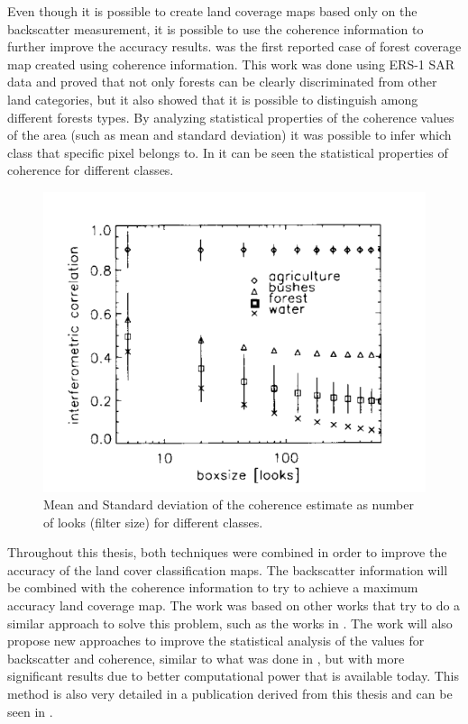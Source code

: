 Even though it is possible to create land coverage maps based only on the backscatter measurement, it is possible to use the coherence information to further improve the accuracy results. \cite{first_interferometric} was the first reported case of forest coverage map created using coherence information. This work was done using ERS-1 SAR data and proved that not only forests can be clearly discriminated from other land categories, but it also showed that it is possible to distinguish among different forests types. By analyzing statistical properties of the coherence values of the area (such as mean and standard deviation) it was possible to infer which class that specific pixel belongs to. In  it can be seen the statistical properties of coherence for different classes.

\begin{figure}[H]
    \centering
    \includegraphics[width=0.7\linewidth]{Cap2/first_interferometric.png}
    \caption{Mean and Standard deviation of the coherence estimate as number of looks (filter size) for different classes.}
    \label{fig:first_interferometric_estimate}
\end{figure}

Throughout this thesis, both techniques were combined in order to improve the accuracy of the land cover classification maps. The backscatter information will be combined with the coherence information to try to achieve a maximum accuracy land coverage map. The work was based on other works that try to do a similar approach to solve this problem, such as the works in \cite{Paolathesis,Paolo, Martone, Martone2, Martone3, Rizzoli}. The work will also propose new approaches to improve the statistical analysis of the values for backscatter and coherence, similar to what was done in \cite{first_interferometric}, but with more significant results due to better computational power that is available today. This method is also very detailed in a publication derived from this thesis and can be seen in \cite{Rodrigo}.


